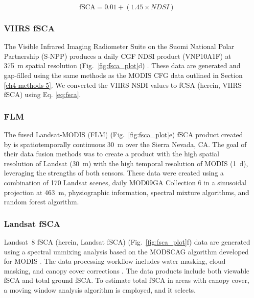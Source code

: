 \begin{equation}
\text{fSCA} = 0.01 + (1.45 \times NDSI)
\label{eq:fsca}
\end{equation}

\hypertarget{ch4-methods-6}{\subsubsection{VIIRS fSCA}\label{ch4-methods-6}}

The Visible Infrared Imaging Radiometer Suite on the Suomi National Polar Partnership (S-NPP) produces a daily CGF NDSI product (VNP10A1F) at 375~m spatial resolution (Fig.~\ref{fig:fsca_plot}d) \citep{hallEvaluationMODISVIIRS2019}. These data are generated and gap-filled using the same methods as the MODIS CFG data outlined in Section \ref{ch4-methods-5}. We converted the VIIRS NSDI values to fCSA (herein, VIIRS fSCA) using Eq. \ref{eq:fsca}.

\hypertarget{ch4-methods-7}{\subsubsection{FLM}\label{ch4-methods-7}}

The fused Landsat-MODIS (FLM) (Fig.~\ref{fig:fsca_plot}e) fSCA product created by \cite{rittgerMultisensorFusionUsing2021} is spatiotemporally continuous 30~m over the Sierra Nevada, CA. The goal of their data fusion methods was to create a product with the high spatial resolution of Landsat (30~m) with the high temporal resolution of MODIS (1~d), leveraging the strengths of both sensors. These data were created using a combination of 170 Landsat scenes, daily MOD09GA Collection 6 in a sinusoidal projection at 463~m, physiographic information, spectral mixture algorithms, and random forest algorithm. 

\hypertarget{ch4-methods-8}{\subsubsection{Landsat fSCA}\label{ch4-methods-8}}

Landsat~8 fSCA (herein, Landsat fSCA) (Fig.~\ref{fig:fsca_plot}f) \citep{selkowitzUSGSLandsatSnow2017} data are generated using a spectral unmixing analysis based on the MODSCAG algorithm developed for MODIS \citep{painterRetrievalSubpixelSnow2009}. The data processing workflow includes water masking, cloud masking, and canopy cover corrections \citep{selkowitzUSGSLandsatSnow2017, stillingerLandsatMODISVIIRS2023}. The data products include both viewable fSCA and total ground fSCA. To estimate total fSCA in areas with canopy cover, a moving window analysis algorithm is employed, and it selects.

